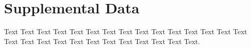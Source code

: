 \section*{Supplemental Data}
Text Text Text Text Text Text  Text Text Text Text Text Text Text Text Text  Text Text Text Text Text Text Text Text Text  Text Text Text.